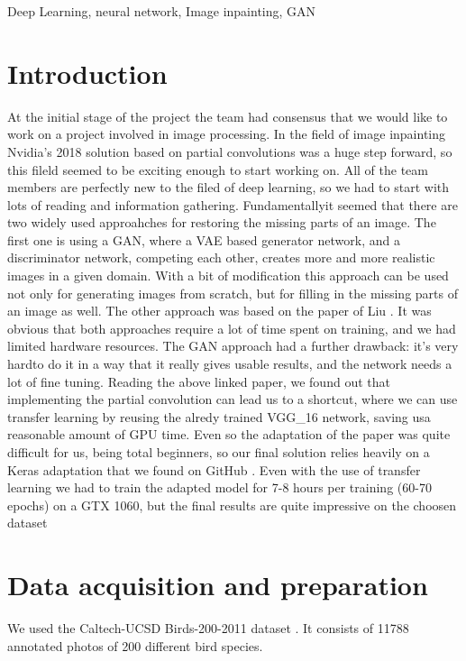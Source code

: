 \documentclass[conference]{IEEEtran}
\begin{document}
\begin{IEEEkeywords}
Deep Learning, neural network, Image inpainting, GAN
\end{IEEEkeywords}

\section{Introduction}
At the initial stage of the project the team had consensus that we would like to work on a project involved in image processing. In the field of image inpainting Nvidia’s 2018 solution based on partial convolutions was a huge step forward, so this fileld seemed to be exciting enough to start working on. All of the team members are perfectly new to the filed of deep learning, so we had to start with lots of reading and information gathering. Fundamentallyit seemed that there are two widely used approahches for restoring the missing parts of an image. The first one is using a GAN, where a VAE based generator network, and a discriminator network, competing each other, creates more and more realistic images in a given domain. With a bit of modification this approach can be used not only for generating images from scratch, but for filling in the missing parts of an image as well. The other approach was based on the paper of Liu \cite{nvidia_paper}. It was obvious that both approaches require a lot of time spent on training, and we had limited hardware resources. The GAN approach had a further drawback: it’s very hardto do it in a way that it really gives usable results, and the network needs a lot of fine tuning. Reading the above linked paper, we found out that implementing the partial convolution can lead us to a shortcut, where we can use transfer learning by reusing the alredy trained VGG\_16 network, saving usa reasonable amount of GPU time. Even so the adaptation of the paper was quite difficult for us, being total beginners, so our final solution relies heavily on a Keras adaptation that we found on GitHub \cite{pconv_keras}. Even with the use of transfer learning we had to train the adapted model for 7-8 hours per training (60-70 epochs) on a GTX 1060, but the final results are quite impressive on the choosen dataset

\section{Data acquisition and preparation}
We used the Caltech-UCSD Birds-200-2011 dataset \cite{dataset}. It consists of 11788 annotated photos of 200 different bird species.
\end{document}
